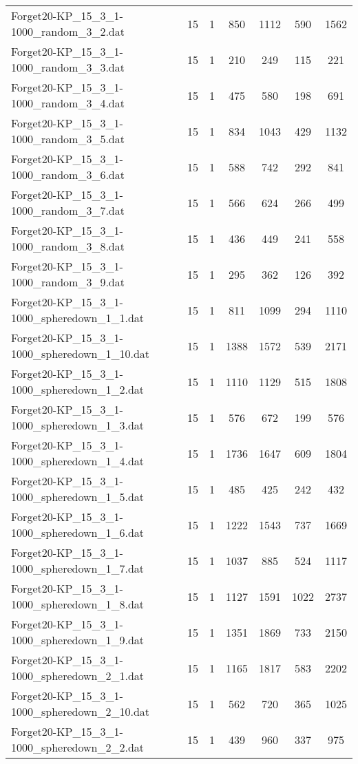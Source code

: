 \begin{table}[!ht]
\begin{tabular}{lcccccc}
Forget20-KP\_15\_3\_1-1000\_random\_3\_2.dat & 15 & 1 & 850 & 1112 & 590 & 1562 \\
Forget20-KP\_15\_3\_1-1000\_random\_3\_3.dat & 15 & 1 & 210 & 249 & 115 & 221 \\
Forget20-KP\_15\_3\_1-1000\_random\_3\_4.dat & 15 & 1 & 475 & 580 & 198 & 691 \\
Forget20-KP\_15\_3\_1-1000\_random\_3\_5.dat & 15 & 1 & 834 & 1043 & 429 & 1132 \\
Forget20-KP\_15\_3\_1-1000\_random\_3\_6.dat & 15 & 1 & 588 & 742 & 292 & 841 \\
Forget20-KP\_15\_3\_1-1000\_random\_3\_7.dat & 15 & 1 & 566 & 624 & 266 & 499 \\
Forget20-KP\_15\_3\_1-1000\_random\_3\_8.dat & 15 & 1 & 436 & 449 & 241 & 558 \\
Forget20-KP\_15\_3\_1-1000\_random\_3\_9.dat & 15 & 1 & 295 & 362 & 126 & 392 \\
Forget20-KP\_15\_3\_1-1000\_spheredown\_1\_1.dat & 15 & 1 & 811 & 1099 & 294 & 1110 \\
Forget20-KP\_15\_3\_1-1000\_spheredown\_1\_10.dat & 15 & 1 & 1388 & 1572 & 539 & 2171 \\
Forget20-KP\_15\_3\_1-1000\_spheredown\_1\_2.dat & 15 & 1 & 1110 & 1129 & 515 & 1808 \\
Forget20-KP\_15\_3\_1-1000\_spheredown\_1\_3.dat & 15 & 1 & 576 & 672 & 199 & 576 \\
Forget20-KP\_15\_3\_1-1000\_spheredown\_1\_4.dat & 15 & 1 & 1736 & 1647 & 609 & 1804 \\
Forget20-KP\_15\_3\_1-1000\_spheredown\_1\_5.dat & 15 & 1 & 485 & 425 & 242 & 432 \\
Forget20-KP\_15\_3\_1-1000\_spheredown\_1\_6.dat & 15 & 1 & 1222 & 1543 & 737 & 1669 \\
Forget20-KP\_15\_3\_1-1000\_spheredown\_1\_7.dat & 15 & 1 & 1037 & 885 & 524 & 1117 \\
Forget20-KP\_15\_3\_1-1000\_spheredown\_1\_8.dat & 15 & 1 & 1127 & 1591 & 1022 & 2737 \\
Forget20-KP\_15\_3\_1-1000\_spheredown\_1\_9.dat & 15 & 1 & 1351 & 1869 & 733 & 2150 \\
Forget20-KP\_15\_3\_1-1000\_spheredown\_2\_1.dat & 15 & 1 & 1165 & 1817 & 583 & 2202 \\
Forget20-KP\_15\_3\_1-1000\_spheredown\_2\_10.dat & 15 & 1 & 562 & 720 & 365 & 1025 \\
Forget20-KP\_15\_3\_1-1000\_spheredown\_2\_2.dat & 15 & 1 & 439 & 960 & 337 & 975 \\

\end{tabular}
\end{table}
